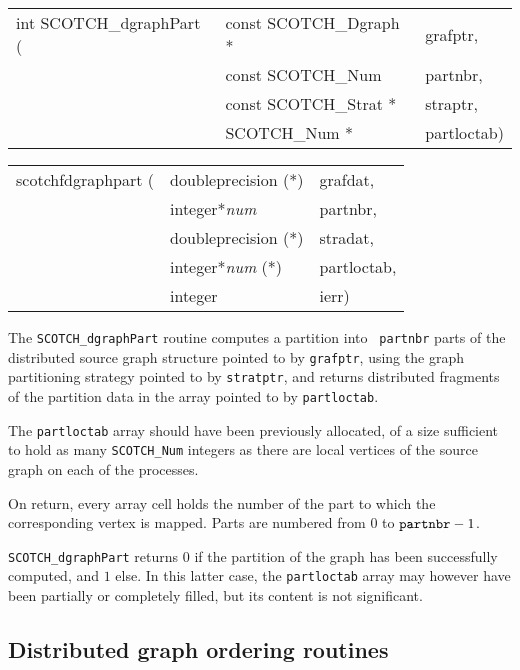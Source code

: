 \begin{itemize}
\progsyn

{\tt\begin{tabular}{l@{}ll}
int SCOTCH\_dgraphPart ( & const SCOTCH\_Dgraph * & grafptr, \\
                         & const SCOTCH\_Num      & partnbr, \\
                         & const SCOTCH\_Strat *  & straptr, \\
                         & SCOTCH\_Num *          & partloctab)
\end{tabular}}

{\tt\begin{tabular}{l@{}ll}
scotchfdgraphpart ( & doubleprecision (*)   & grafdat,    \\
                    & integer*{\it num}     & partnbr,    \\
                    & doubleprecision (*)   & stradat,    \\
                    & integer*{\it num} (*) & partloctab, \\
                    & integer               & ierr)
\end{tabular}}

\progdes

The {\tt SCOTCH\_dgraphPart} routine computes a partition into {\tt
partnbr} parts of the distributed source graph structure pointed to
by {\tt grafptr}, using the graph partitioning strategy pointed to by
{\tt stratptr}, and returns distributed fragments of the partition
data in the array pointed to by {\tt partloctab}.

The {\tt partloctab} array should have been previously allocated, of a
size sufficient to hold as many {\tt SCOTCH\_\lbt Num} integers as
there are local vertices of the source graph on each of the processes.

On return, every array cell holds the number of the part to which the
corresponding vertex is mapped. Parts are numbered from $0$ to
$\mbox{\tt partnbr} - 1$.

\progret

{\tt SCOTCH\_dgraphPart} returns $0$ if the partition of the graph has
been successfully computed, and $1$ else. In this latter case, the
{\tt partloctab} array may however have been partially or completely
filled, but its content is not significant.
\end{itemize}

\subsection{Distributed graph ordering routines}

